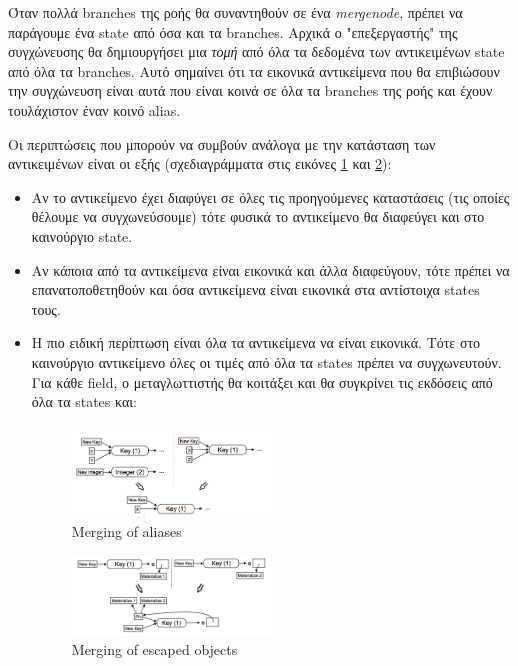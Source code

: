Όταν πολλά branches της ροής θα συναντηθούν σε ένα \textit{mergenode}, πρέπει να
παράγουμε ένα state από όσα και τα branches. Αρχικά ο "επεξεργαστής" της
συγχώνευσης θα δημιουργήσει μια \textit{τομή} από όλα τα δεδομένα των
αντικειμένων state από όλα τα branches. Αυτό σημαίνει ότι τα εικονικά
αντικείμενα που θα επιβιώσουν την συγχώνευση είναι αυτά που είναι κοινά σε όλα
τα branches της ροής και έχουν τουλάχιστον έναν κοινό alias.

Οι περιπτώσεις που μπορούν να συμβούν ανάλογα με την κατάσταση των αντικειμένων
είναι οι εξής (σχεδιαγράμματα στις εικόνες \ref{figure-41} και \ref{figure-42}):

\begin{itemize}

\item Αν το αντικείμενο έχει διαφύγει σε όλες τις προηγούμενες καταστάσεις (τις
οποίες θέλουμε να συγχωνεύσουμε) τότε φυσικά το αντικείμενο θα διαφεύγει και στο
καινούργιο state.

\item Αν κάποια από τα αντικείμενα είναι εικονικά και άλλα διαφεύγουν, τότε
πρέπει να επανατοποθετηθούν και όσα αντικείμενα είναι εικονικά στα αντίστοιχα
states τους.

\item Η πιο ειδική περίπτωση είναι όλα τα αντικείμενα να είναι εικονικά. Τότε
στο καινούργιο αντικείμενο όλες οι τιμές από όλα τα states πρέπει να
συγχωνευτούν. Για κάθε field, ο μεταγλωττιστής θα κοιτάξει και θα συγκρίνει τις
εκδόσεις από όλα τα states και:

\begin{figure}[h]
\centering
\includegraphics[width=0.5\textwidth]{merging-aliases.png}
\caption{Merging of aliases}
\label{figure-41}
\end{figure}

\begin{figure}[h]
\centering
\includegraphics[width=0.5\textwidth]{merging-escaped.png}
\caption{Merging of escaped objects}
\label{figure-42}
\end{figure}


\end{itemize}
